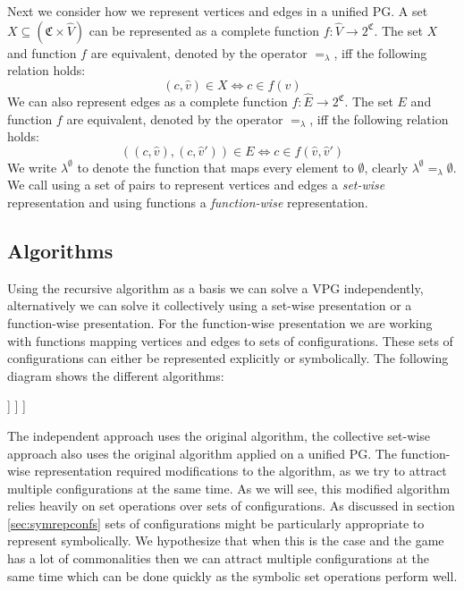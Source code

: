 Next we consider how we represent vertices and edges in a unified PG. A set $X \subseteq (\mathfrak{C} \times \hat{V})$ can be represented as a complete function $f : \hat{V} \rightarrow 2^\mathfrak{C}$. The set $X$ and function $f$ are equivalent, denoted by the operator $=_\lambda$, iff the following relation holds:
\[ (c,\hat{v}) \in X \iff c \in f(\hat{v}) \]
We can also represent edges as a complete function $f : \hat{E} \rightarrow 2^\mathfrak{C}$. The set $E$ and function $f$ are equivalent, denoted by the operator $=_\lambda$, iff the following relation holds:
\[ ((c,\hat{v}),(c,\hat{v}')) \in E \iff c \in f(\hat{v},\hat{v}') \]
We write $\lambda^\emptyset$ to denote the function that maps every element to $\emptyset$, clearly $\lambda^\emptyset =_\lambda \emptyset$. We call using a set of pairs to represent vertices and edges a \textit{set-wise} representation and using functions a \textit{function-wise} representation.

\subsection{Algorithms}
Using the recursive algorithm as a basis we can solve a VPG independently, alternatively we can solve it collectively using a set-wise presentation or a function-wise presentation. For the function-wise presentation we are working with functions mapping vertices and edges to sets of configurations. These sets of configurations can either be represented explicitly or symbolically. The following diagram shows the different algorithms:
\begin{center}
	\begin{forest}
		[Recursive algorithm, for tree={parent anchor=south, child anchor=north, align=center, s sep=5mm}
		[Independent]
		[Collective
		[Set-wise]
		[Function-wise
		[Explicit]
		[Symbolic]
		]
		]
		]
	\end{forest}
\end{center}
The independent approach uses the original algorithm, the collective set-wise approach also uses the original algorithm applied on a unified PG. The function-wise representation required modifications to the algorithm, as we try to attract multiple configurations at the same time. As we will see, this modified algorithm relies heavily on set operations over sets of configurations. As discussed in section \ref{sec:symrepconfs} sets of configurations might be particularly appropriate to represent symbolically. We hypothesize that when  this is the case and the game has a lot of commonalities then we can attract multiple configurations at the same time which can be done quickly as the symbolic set operations perform well.

